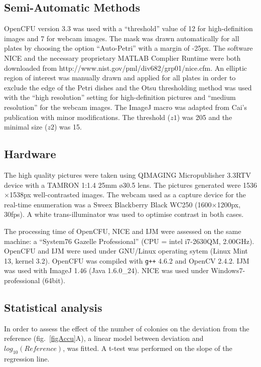 \documentclass[10pt]{article}
\newcommand{\IJM}{IJM}
\begin{document}
\subsection*{Semi-Automatic Methods} 

OpenCFU version 3.3 was used with a ``threshold'' value of 12 for high-definition images and 7 for webcam images.
The mask was drawn automatically for all plates by choosing the option ``Auto-Petri'' with a margin of -25px. 
The software NICE and the necessary proprietary MATLAB Complier Runtime were both downloaded from
http://www.nist.gov/pml/div682/grp01/nice.cfm.
An elliptic region of interest was manually drawn and applied for all plates
in order to exclude the edge of the Petri dishes and the Otsu thresholding method
was used with the ``high resolution'' setting for high-definition pictures and ``medium resolution'' for the webcam images.
The ImageJ macro was adapted from Cai's publication\cite{cai_optimized_2011} with minor modifications.
The threshold ($z1$) was 205 and the minimal size ($z2$) was 15.


\subsection*{Hardware} 
The high quality pictures were taken using QIMAGING Micropublisher 3.3RTV
device with a TAMRON 1:1.4 25mm \o 30.5 lens. The pictures generated were
1536$\times{}$1538px well-contrasted images.
The webcam used as a capture device for the real-time enumeration was a Sweex
Blackberry Black WC250 (1600$\times{}$1200px, 30fps).
A white trans-illuminator was used to optimise contrast in both cases.

The processing time of OpenCFU, NICE and \IJM{} were assessed on the same
machine: a ``System76 Gazelle Professional'' (CPU = intel i7-2630QM,
2.00GHz).
OpenCFU and \IJM{} were used under GNU/Linux operating sytem (Linux Mint 13, kernel
3.2).
OpenCFU was compiled with \texttt{g++} 4.6.2 and OpenCV 2.4.2.
\IJM{} was used with ImageJ 1.46 (Java 1.6.0\_24).
NICE was used under Windows7-professional (64bit).

\subsection*{Statistical analysis} 
In order to assess the effect of the
number of colonies on the deviation from the reference (fig.~\ref{figAccu}A), a
linear model between deviation and $log_{10} (Reference)$, was fitted.  A t-test
was performed on the slope of the regression line.
\end{document}
